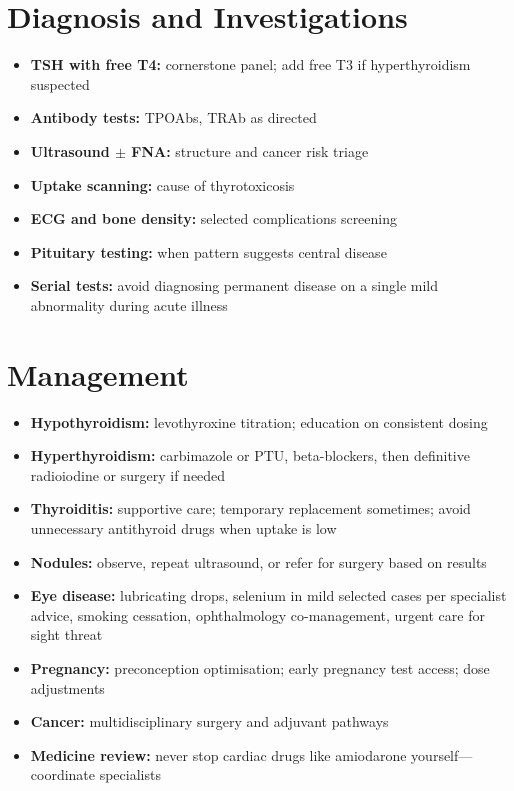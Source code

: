 \section*{Diagnosis and Investigations}
\begin{itemize}
    \item \textbf{TSH with free T4:} cornerstone panel; add free T3 if hyperthyroidism suspected
    \item \textbf{Antibody tests:} TPOAbs, TRAb as directed
    \item \textbf{Ultrasound $\pm$ FNA:} structure and cancer risk triage
    \item \textbf{Uptake scanning:} cause of thyrotoxicosis
    \item \textbf{ECG and bone density:} selected complications screening
    \item \textbf{Pituitary testing:} when pattern suggests central disease
    \item \textbf{Serial tests:} avoid diagnosing permanent disease on a single mild abnormality during acute illness
\end{itemize}

\section*{Management}
\begin{itemize}
    \item \textbf{Hypothyroidism:} levothyroxine titration; education on consistent dosing
    \item \textbf{Hyperthyroidism:} carbimazole or PTU, beta-blockers, then definitive radioiodine or surgery if needed
    \item \textbf{Thyroiditis:} supportive care; temporary replacement sometimes; avoid unnecessary antithyroid drugs when uptake is low
    \item \textbf{Nodules:} observe, repeat ultrasound, or refer for surgery based on results
    \item \textbf{Eye disease:} lubricating drops, selenium in mild selected cases per specialist advice, smoking cessation, ophthalmology co-management, urgent care for sight threat
    \item \textbf{Pregnancy:} preconception optimisation; early pregnancy test access; dose adjustments
    \item \textbf{Cancer:} multidisciplinary surgery and adjuvant pathways
    \item \textbf{Medicine review:} never stop cardiac drugs like amiodarone yourself---coordinate specialists
\end{itemize}

